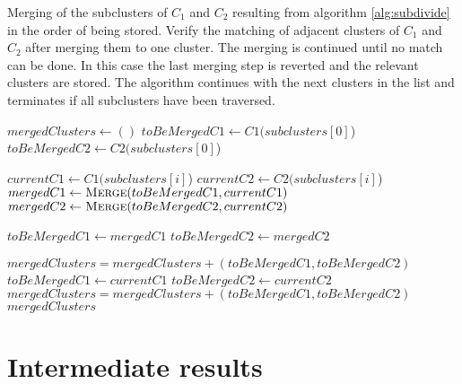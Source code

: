 \begin{algorithm}[tbp]
	\caption{Merging of the subclusters of $C_1$ and $C_2$ resulting from algorithm \ref{alg:subdivide} in the order of being stored. Verify the matching of adjacent clusters of $C_1$ and $C_2$ after merging them to one cluster. The merging is continued until no match can be done. In this case the last merging step is reverted and the relevant clusters are stored. The algorithm continues with the next clusters in the list and terminates if all subclusters have been traversed.}
	\label{alg:merging}
	
	\begin{algorithmic}[1]     %
		\label{merging}

		\State $\mathit{mergedClusters} \gets ()$
		\State $toBeMergedC1 \gets C1(subclusters[0]$)
		\State $toBeMergedC2 \gets C2(subclusters[0]$)
		
		\State $currentC1 \gets C1(subclusters[i]$)
		\State $currentC2 \gets C2(subclusters[i]$)
		\State $mergedC1 \gets \Call{Merge}{toBeMergedC1, currentC1}$
		\State $mergedC2 \gets \Call{Merge}{toBeMergedC2, currentC2}$
		
		\State $\mathit{toBeMergedC1 \gets mergedC1}$
		\State $\mathit{toBeMergedC2 \gets mergedC2}$
		
		\Else
		\State $\mathit{mergedClusters = mergedClusters + (toBeMergedC1, toBeMergedC2)}$
		\State $toBeMergedC1 \gets currentC1$
		\State $toBeMergedC2 \gets currentC2$
		\EndIf
		\EndFor
		\State $\mathit{mergedClusters = mergedClusters + (toBeMergedC1, toBeMergedC2)}$
		\State\Return $\mathit{mergedClusters}$
		\EndProcedure	
	\end{algorithmic}
\end{algorithm}

\section{Intermediate results}

